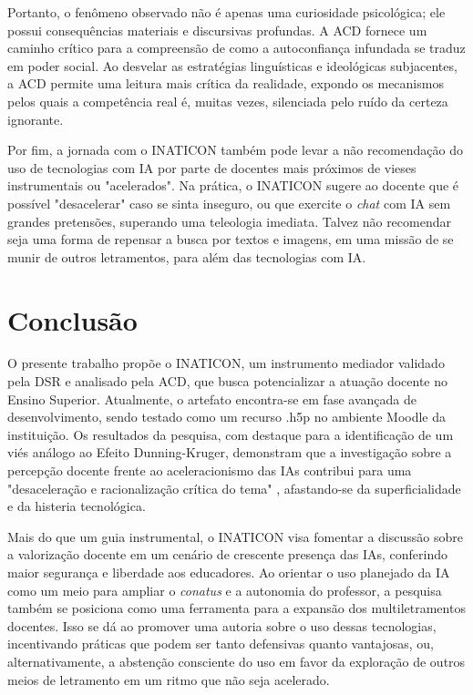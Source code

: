\documentclass[portuguese]{textolivre}
\begin{document}
Portanto, o fenômeno observado não é apenas uma curiosidade psicológica; ele possui consequências materiais e discursivas profundas. A ACD fornece um caminho crítico para a compreensão de como a autoconfiança infundada se traduz em poder social. Ao desvelar as estratégias linguísticas e ideológicas subjacentes, a ACD permite uma leitura mais crítica da realidade, expondo os mecanismos pelos quais a competência real é, muitas vezes, silenciada pelo ruído da certeza ignorante.

Por fim, a jornada com o INATICON também pode levar a não recomendação do uso de tecnologias com IA por parte de docentes mais próximos de vieses instrumentais ou "acelerados". Na prática, o INATICON sugere ao docente que é possível "desacelerar" caso se sinta inseguro, ou que exercite o \textit{chat} com IA sem grandes pretensões, superando uma teleologia imediata. Talvez não recomendar seja uma forma de repensar a busca por textos e imagens, em uma missão de se munir de outros letramentos, para além das tecnologias com IA.

\section{Conclusão}\label{sec-secoes}
O presente trabalho propõe o INATICON, um instrumento mediador validado pela DSR e analisado pela ACD, que busca potencializar a atuação docente no Ensino Superior. Atualmente, o artefato encontra-se em fase avançada de desenvolvimento, sendo testado como um recurso .h5p no ambiente Moodle da instituição. Os resultados da pesquisa, com destaque para a identificação de um viés análogo ao Efeito Dunning-Kruger, demonstram que a investigação sobre a percepção docente frente ao aceleracionismo das IAs contribui para uma "desaceleração e racionalização crítica do tema" \cite{selwyn2024limits}, afastando-se da superficialidade e da histeria tecnológica.

Mais do que um guia instrumental, o INATICON visa fomentar a discussão sobre a valorização docente em um cenário de crescente presença das IAs, conferindo maior segurança e liberdade aos educadores. Ao orientar o uso planejado da IA como um meio para ampliar o \textit{conatus} e a autonomia do professor, a pesquisa também se posiciona como uma ferramenta para a expansão dos multiletramentos docentes. Isso se dá ao promover uma autoria sobre o uso dessas tecnologias, incentivando práticas que podem ser tanto defensivas quanto vantajosas, ou, alternativamente, a abstenção consciente do uso em favor da exploração de outros meios de letramento em um ritmo que não seja acelerado.
\end{document}

